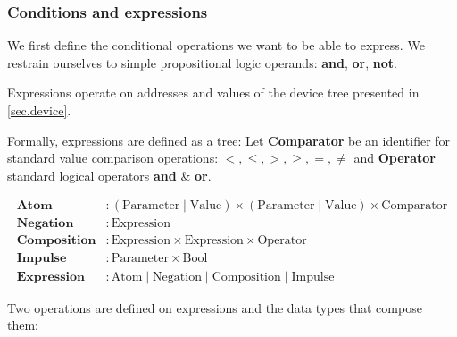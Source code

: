 \documentclass[applsci,article,submit,moreauthors,pdftex,10pt,a4paper]{mdpi}
\begin{document}
    
    
\subsubsection{Conditions and expressions}
We first define the conditional operations we want to be able to express.
We restrain ourselves to simple propositional logic operands: \textbf{and}, \textbf{or}, \textbf{not}.

Expressions operate on addresses and values of the device tree presented in \ref{sec.device}.

Formally, expressions are defined as a tree:
Let \textbf{Comparator} be an identifier for standard value comparison operations: $<, \leq, >, \geq, =, \neq$ and \textbf{Operator} standard logical operators \textbf{and} \&  \textbf{or}.

\begin{align*}
    \mathbf{Atom} & :  (\mathrm{Parameter} \mid \mathrm{Value}) \times (\mathrm{Parameter} \mid \mathrm{Value}) \times \mathrm{Comparator} \\
    \mathbf{Negation} & : \mathrm{Expression} \\
    \mathbf{Composition} & : \mathrm{Expression} \times \mathrm{Expression} \times \mathrm{Operator} \\
    \mathbf{Impulse} & : \mathrm{Parameter} \times \mathrm{Bool} \\
    \mathbf{Expression} &: \mathrm{Atom} \mid \mathrm{Negation} \mid \mathrm{Composition} \mid \mathrm{Impulse}
\end{align*}

Two operations are defined on expressions and the data types that compose them: 
\end{document}
